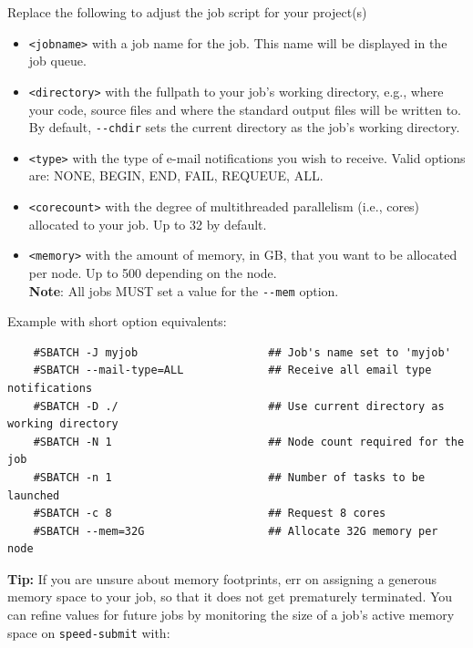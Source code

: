 \noindent Replace the following to adjust the job script for your project(s)
\begin{itemize}
    \item \verb+<jobname>+ with a job name for the job. This name will be displayed in the job queue.
    \item \verb+<directory>+ with the fullpath to your job's working directory, e.g., where your code, 
    source files and where the standard output files will be written to. 
    By default, \verb+--chdir+ sets the current directory as the job's working directory.
    \item \verb+<type>+ with the type of e-mail notifications you wish to receive. 
    Valid options are: NONE, BEGIN, END, FAIL, REQUEUE, ALL.
    \item \verb+<corecount>+ with the degree of multithreaded parallelism (i.e., cores) allocated to your job. Up to 32 by default.
    \item \verb+<memory>+ with the amount of memory, in GB, that you want to be allocated per node. Up to 500 depending on the node.\\
    \textbf{Note}: All jobs MUST set a value for the \verb|--mem| option.
\end{itemize}

\noindent Example with short option equivalents:
\begin{verbatim}
    #SBATCH -J myjob                    ## Job's name set to 'myjob'
    #SBATCH --mail-type=ALL             ## Receive all email type notifications
    #SBATCH -D ./                       ## Use current directory as working directory
    #SBATCH -N 1                        ## Node count required for the job
    #SBATCH -n 1                        ## Number of tasks to be launched
    #SBATCH -c 8                        ## Request 8 cores
    #SBATCH --mem=32G                   ## Allocate 32G memory per node 
\end{verbatim}

\noindent\textbf{Tip:} If you are unsure about memory footprints, err on assigning a generous
memory space to your job, so that it does not get prematurely terminated.
You can refine  values for future jobs by monitoring the size of a job's active
memory space on \texttt{speed-submit} with:

